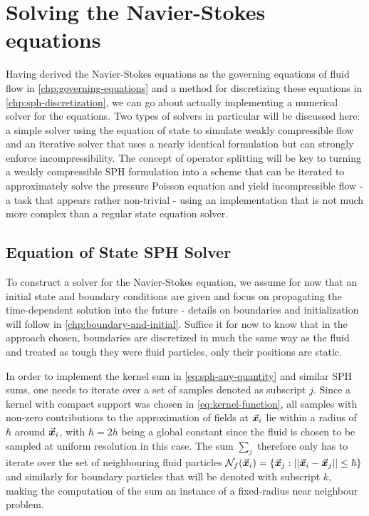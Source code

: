 
\chapter{Solving the Navier-Stokes equations}\label{chp:solvers}

Having derived the Navier-Stokes equations as the governing equations of fluid flow in \autoref{chp:governing-equations} and a method for discretizing these equations in \autoref{chp:sph-discretization}, we can go about actually implementing a numerical solver for the equations. Two types of solvers in particular will be discussed here: a simple solver using the equation of state to simulate weakly compressible flow and an iterative solver that uses a nearly identical formulation but can strongly enforce incompressibility. The concept of operator splitting will be key to turning a weakly compressible SPH formulation into a scheme that can be iterated to approximately solve the pressure Poisson equation and yield incompressible flow - a task that appears rather non-trivial - using an implementation that is not much more complex than a regular state equation solver.

\section{Equation of State SPH Solver}
To construct a solver for the Navier-Stokes equation, we assume for now that an initial state and boundary conditions are given and focus on propagating the time-dependent solution into the future - details on boundaries and initialization will follow in \autoref{chp:boundary-and-initial}. Suffice it for now to know that in the approach chosen, boundaries are discretized in much the same way as the fluid and treated as tough they were fluid particles, only their positions are static.

In order to implement the kernel sum in \autoref{eq:sph-any-quantity} and similar SPH sums, one needs to iterate over a set of samples denoted as subscript $j$. Since a kernel with compact support was chosen in \autoref{eq:kernel-function}, all samples with non-zero contributions to the approximation of fields at $\vec{\bm{x}}_i$ lie within a radius of $\hbar$ around $\vec{\bm{x}}_i$, with $\hbar=2h$ being a global constant since the fluid is chosen to be sampled at uniform resolution in this case. The sum $\sum_j$ therefore only has to iterate over the set of neighbouring fluid particles $\mathcal{N}_{f}(\vec{\bm{x}}_i) = \{\vec{\bm{x}}_j: \left|\left|\vec{\bm{x}}_i-\vec{\bm{x}}_j\right|\right|\leq\hbar\}$ and similarly for boundary particles that will be denoted with subscript $k$, making the computation of the sum an instance of a fixed-radius near neighbour problem\autocite*{tutorial}.

